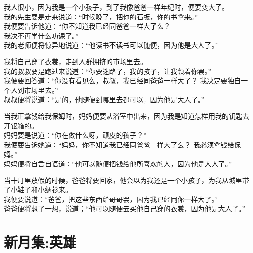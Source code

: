 \documentclass[
]{book}
\renewenvironment{quote}{\begin{VF}}{\end{VF}}
\begin{document}
\begin{quote}
我人很小，因为我是一个小孩子，到了我像爸爸一样年纪时，便要变大了。\\
我的先生要是走来说道：``时候晚了，把你的石板，你的书拿来。''\\
我便要告诉他道：``你不知道我已经同爸爸一样大了么？\\
我决不再学什么功课了。''\\
我的老师便将惊异地说道：``他读书不读书可以随便，因为他是大人了。''

我将自己穿了衣裳，走到人群拥挤的市场里去。\\
我的叔叔要是跑过来说道：``你要迷路了，我的孩子，让我领着你罢。''\\
我便要回答道：``你没有看见么，叔叔，我已经同爸爸一样大了？ 我决定要独自一个人到市场里去。''\\
叔叔便将说道：``是的，他随便到哪里去都可以，因为他是大人了。''

当我正拿钱给我保姆时，妈妈便要从浴室中出来，因为我是知道怎样用我的钥匙去开银箱的。\\
妈妈要是说道：``你在做什么呀，顽皮的孩子？''\\
我便要告诉她道：``妈妈，你不知道我已经同爸爸一样大了么？ 我必须拿钱给保姆。''\\
妈妈便将自言自语道：``他可以随便把钱给他所喜欢的人，因为他是大人了。''

当十月里放假的时候，爸爸将要回家，他会以为我还是一个小孩子，为我从城里带了小鞋子和小绸衫来。\\
我便要说道：``爸爸，把这些东西给哥哥罢，因为我已经同你一样大了。''\\
爸爸便将想了一想，说道；``他可以随便去买他自己穿的衣裳，因为他是大人了。''
\end{quote}

\hypertarget{section-36}{%
\section{新月集:英雄}\label{section-36}}
\end{document}
